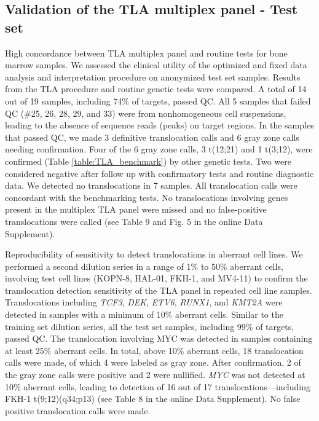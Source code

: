 \subsection{Validation of the TLA multiplex panel - Test set}
High concordance between TLA multiplex panel and routine tests for bone marrow samples. 
We assessed the clinical utility of the optimized and fixed data analysis and interpretation procedure on anonymized test set samples.
Results from the TLA procedure and routine genetic tests were compared. 
A total of 14 out of 19 samples, including 74\% of targets, passed QC. 
All 5 samples that failed QC (\#25, 26, 28, 29, and 33) were from nonhomogeneous cell suspensions, leading to the absence of sequence reads (peaks) on target regions. 
In the samples that passed QC, we made 3 definitive translocation calls and 6 gray zone calls needing confirmation. 
Four of the 6 gray zone calls, 3 t(12;21) and 1 t(3;12), were confirmed (Table \ref{table:TLA_benchmark}) by other genetic tests. 
Two were considered negative after follow up with confirmatory tests and routine diagnostic data. 
We detected no translocations in 7 samples. 
All translocation calls were concordant with the benchmarking tests. 
No translocations involving genes present in the multiplex TLA panel were missed and no false-positive translocations were called (see Table 9 and Fig. 5 in the online Data Supplement).

Reproducibility of sensitivity to detect translocations in aberrant cell lines. 
We performed a second dilution series in a range of 1\% to 50\% aberrant cells, involving test cell lines (KOPN-8, HAL-01, FKH-1, and MV4-11) to confirm the translocation detection sensitivity of the TLA panel in repeated cell line samples. 
Translocations including \textsl{TCF3}, \textsl{DEK}, \textsl{ETV6}, \textsl{RUNX1}, and \textsl{KMT2A} were detected in samples with a minimum of 10\% aberrant cells. 
Similar to the training set dilution series, all the test set samples, including 99\% of targets, passed QC. 
The translocation involving MYC was detected in samples containing at least 25\% aberrant cells. 
In total, above 10\% aberrant cells, 18 translocation calls were made, of which 4 were labeled as gray zone. 
After confirmation, 2 of the gray zone calls were positive and 2 were nullified. 
\textsl{MYC} was not detected at 10\% aberrant cells, leading to detection of 16 out of 17 translocations—including FKH-1 t(9;12)(q34;p13) (see Table 8 in the online Data Supplement). 
No false positive translocation calls were made.


